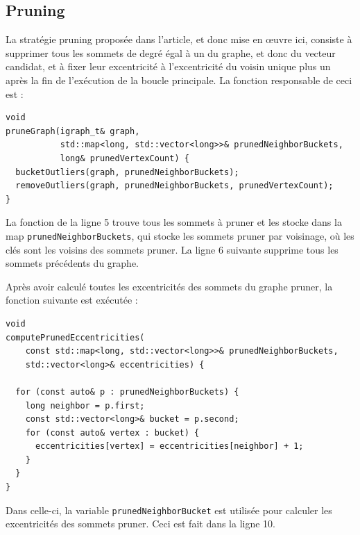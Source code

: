 \documentclass[11pt]{article}
\begin{document}
\subsection{Pruning}
La stratégie pruning proposée dans l'article, et donc mise en œuvre ici,
consiste à supprimer tous les sommets de degré égal à un du graphe, et donc du
vecteur candidat, et à fixer leur excentricité à l'excentricité du voisin unique
plus un après la fin de l'exécution de la boucle principale. La fonction
responsable de ceci est :
\begin{verbatim}
void
pruneGraph(igraph_t& graph,
           std::map<long, std::vector<long>>& prunedNeighborBuckets,
           long& prunedVertexCount) {
  bucketOutliers(graph, prunedNeighborBuckets);
  removeOutliers(graph, prunedNeighborBuckets, prunedVertexCount);
}
\end{verbatim}
La fonction de la ligne 5 trouve tous les sommets à pruner et les stocke dans la
map \texttt{prunedNeighborBuckets}, qui stocke les sommets pruner par voisinage,
où les clés sont les voisins des sommets pruner. La ligne 6 suivante supprime
tous les sommets précédents du graphe. \par Après avoir calculé toutes les
excentricités des sommets du graphe pruner, la fonction suivante est exécutée :
\newpage
\begin{verbatim}
void
computePrunedEccentricities(
    const std::map<long, std::vector<long>>& prunedNeighborBuckets,
    std::vector<long>& eccentricities) {

  for (const auto& p : prunedNeighborBuckets) {
    long neighbor = p.first;
    const std::vector<long>& bucket = p.second;
    for (const auto& vertex : bucket) {
      eccentricities[vertex] = eccentricities[neighbor] + 1;
    }
  }
}
\end{verbatim}
Dans celle-ci, la variable \texttt{prunedNeighborBucket} est utilisée pour
calculer les excentricités des sommets pruner. Ceci est fait dans la ligne 10.
\end{document}
